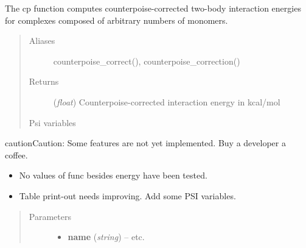 \documentclass[letterpaper,10pt,english]{sphinxmanual}
\begin{document}
\begin{fulllineitems}
\label{cp:wrappers.cp}
The cp function computes counterpoise-corrected two-body interaction energies
for complexes composed of arbitrary numbers of monomers.
\begin{quote}\begin{description}
\item[{Aliases }] \leavevmode
counterpoise\_correct(), counterpoise\_correction()

\item[{Returns}] \leavevmode
(\emph{float}) Counterpoise-corrected interaction energy in kcal/mol

\item[{Psi variables}] \leavevmode
\end{description}\end{quote}

\begin{fulllineitems}
\label{cp:envvar-CP-CORRECTED2-BODYINTERACTIONENERGY}\label{cp:envvar-UNCP-CORRECTED2-BODYINTERACTIONENERGY}
\end{fulllineitems}


\begin{notice}{caution}{Caution:}
Some features are not yet implemented. Buy a developer a coffee.
\begin{itemize}
\item {} 
No values of func besides energy have been tested.

\item {} 
Table print-out needs improving. Add some PSI variables.

\end{itemize}
\end{notice}
\begin{quote}\begin{description}
\item[{Parameters}] \leavevmode\begin{itemize}
\item {} 
\textbf{name} (\emph{string}) -- 
 \textbar{}\textbar{}  \textbar{}\textbar{} etc.


\end{itemize}
\end{description}
\end{quote}
\end{fulllineitems}
\end{document}

